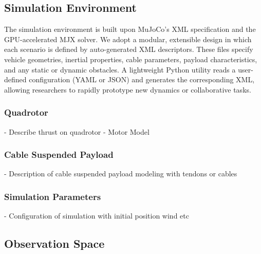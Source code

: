 \subsection{Simulation Environment}
The simulation environment is built upon MuJoCo's XML specification and the GPU-accelerated MJX solver. We adopt a modular, extensible design in which each scenario is defined by auto-generated XML descriptors. These files specify vehicle geometries, inertial properties, cable parameters, payload characteristics, and any static or dynamic obstacles. A lightweight Python utility reads a user-defined configuration (YAML or JSON) and generates the corresponding XML, allowing researchers to rapidly prototype new dynamics or collaborative tasks. 




\subsubsection{Quadrotor}
- Describe thrust on quadrotor
- Motor Model

\subsubsection{Cable Suspended Payload}
- Description of cable suspended payload modeling with tendons or cables
\subsubsection{Simulation Parameters}
- Configuration of simulation with initial position wind etc

\subsection{Observation Space}

